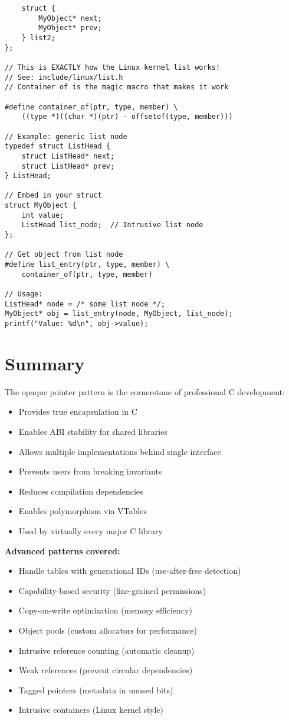 \begin{lstlisting}
    struct {
        MyObject* next;
        MyObject* prev;
    } list2;
};

// This is EXACTLY how the Linux kernel list works!
// See: include/linux/list.h
// Container of is the magic macro that makes it work

#define container_of(ptr, type, member) \
    ((type *)((char *)(ptr) - offsetof(type, member)))

// Example: generic list node
typedef struct ListHead {
    struct ListHead* next;
    struct ListHead* prev;
} ListHead;

// Embed in your struct
struct MyObject {
    int value;
    ListHead list_node;  // Intrusive list node
};

// Get object from list node
#define list_entry(ptr, type, member) \
    container_of(ptr, type, member)

// Usage:
ListHead* node = /* some list node */;
MyObject* obj = list_entry(node, MyObject, list_node);
printf("Value: %d\n", obj->value);
\end{lstlisting}

\section{Summary}

The opaque pointer pattern is the cornerstone of professional C development:

\begin{itemize}
    \item Provides true encapsulation in C
    \item Enables ABI stability for shared libraries
    \item Allows multiple implementations behind single interface
    \item Prevents users from breaking invariants
    \item Reduces compilation dependencies
    \item Enables polymorphism via VTables
    \item Used by virtually every major C library
\end{itemize}

\textbf{Advanced patterns covered:}
\begin{itemize}
    \item Handle tables with generational IDs (use-after-free detection)
    \item Capability-based security (fine-grained permissions)
    \item Copy-on-write optimization (memory efficiency)
    \item Object pools (custom allocators for performance)
    \item Intrusive reference counting (automatic cleanup)
    \item Weak references (prevent circular dependencies)
    \item Tagged pointers (metadata in unused bits)
    \item Intrusive containers (Linux kernel style)
\end{itemize}

